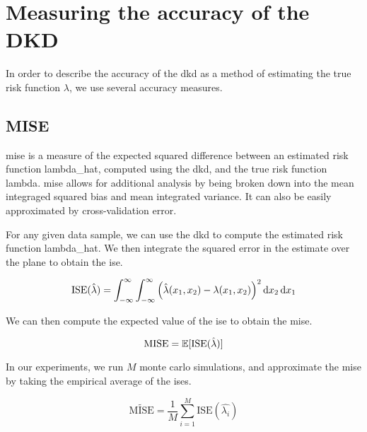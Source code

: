 \section{Measuring the accuracy of the DKD}
\label{sec:method:accuracy}

In order to describe the accuracy of the \gls{dkd} as a method of estimating the true risk function \(\lambda\),
we use several accuracy measures.

\subsection{MISE}
\label{subsec:method:mise}

\Gls{mise} is a measure of the expected squared difference between an estimated risk function \gls{lambda_hat},
computed using the \gls{dkd}, and the true risk function \gls{lambda}.
\Gls{mise} allows for additional analysis by being broken down into the mean integraged squared bias and mean integrated variance.
It can also be easily approximated by cross-validation error.

For any given data sample, we can use the \gls{dkd} to compute the estimated risk function \gls{lambda_hat}.
We then integrate the squared error in the estimate over the plane to obtain the \gls{ise}.

\begin{equation}
\label{eq:ise}
    \mbox{ISE}(\hat{\lambda}) = 
        \int_{-\infty}^{\infty} \int_{-\infty}^{\infty}
            \left(
                \hat{\lambda}(x_1, x_2) - \lambda(x_1, x_2)
            \right)^2 \mathop{}\!\mathrm{d}{x_2} \mathop{}\!\mathrm{d}{x_1}
\end{equation}

We can then compute the expected value of the \gls{ise} to obtain the \gls{mise}.

\begin{equation}
\label{eq:mise}
    \mbox{MISE} = \mathbb{E} [\mbox{ISE}(\hat{\lambda})]
\end{equation}

In our experiments, we run \(M\) monte carlo simulations, and approximate the \gls{mise} by taking the empirical average of the \glspl{ise}.

\begin{equation}
\label{eq:mise_tilde}
    \widetilde{\mbox{MISE}} = \frac{1}{M} \sum_{i=1}^{M} \mbox{ISE}(\hat{\lambda_i})
\end{equation}


